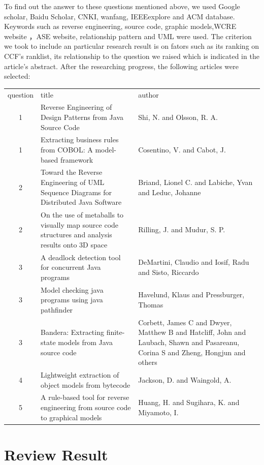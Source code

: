 \documentclass[acmsmall]{acmart}
\begin{document}
    To find out the answer to these questions mentioned above, we used Google scholar, Baidu Scholar, 
    CNKI, wanfang, IEEEexplore and ACM database.
    Keywords such as reverse engineering, source code, graphic models,WCRE website ，ASE website,
    relationship pattern and UML were used.
    The criterion we took to include an particular research result is on fators such as
    its ranking on CCF's ranklist, its relationship to the question we raised which is indicated in the
    article's abstract.
    After the researching progress, the following articles were selected:\\
    \begin{tabular}{|c| p{5cm}|p{5cm}}
      question & title & author\\
      1&Reverse Engineering of Design Patterns from Java Source Code & Shi, N.  and  Olsson, R. A.\\
      1&Extracting business rules from COBOL: A model-based framework& Cosentino, V.  and  Cabot, J.\\
      2&Toward the Reverse Engineering of UML Sequence Diagrams for Distributed Java Software&Briand, Lionel C.  and  Labiche, Yvan  and  Leduc, Johanne\\
      2&On the use of metaballs to visually map source code structures and analysis results onto 3D space&Rilling, J.  and  Mudur, S. P.\\
      3&A deadlock detection tool for concurrent Java programs&DeMartini, Claudio and Iosif, Radu and Sisto, Riccardo\\
      3&Model checking java programs using java pathfinder&Havelund, Klaus and Pressburger, Thomas\\
      3&Bandera: Extracting finite-state models from Java source code&Corbett, James C and Dwyer, Matthew B and Hatcliff, John and Laubach, Shawn and Pasareanu, Corina S and Zheng, Hongjun and others\\
      4&Lightweight extraction of object models from bytecode&Jackson, D.  and  Waingold, A.\\
      5&A rule-based tool for reverse engineering from source code to graphical models&Huang, H.  and  Sugihara, K.  and  Miyamoto, I.\\
    \end{tabular}

\section{Review Result}
\end{document}
